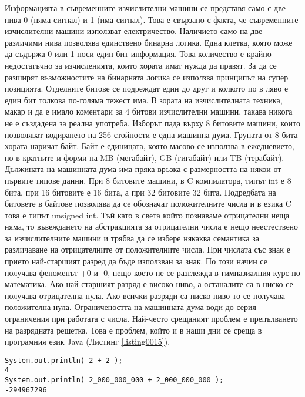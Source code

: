 Информацията в съвременните изчислителни машини се представя само с две нива 0 (няма сигнал) и 1 (има сигнал). Това е свързано с факта, че съвременните изчислителни машини използват електричество. Наличието само на две различими нива позволява единствено бинарна логика. Една клетка, която може да съдържа 0 или 1 носи един бит информация. Това количество е крайно недостатъчно за изчисленията, които хората имат нужда да правят. За да се разширят възможностите на бинарната логика се използва принципът на супер позицията. Отделните битове се подреждат един до друг и колкото по в ляво е един бит толкова по-голяма тежест има. В зората на изчислителната техника, макар и да е имало коментари за 4 битови изчислителни машини, такава никога не е създадена за реална употреба. Изборът пада върху 8 битовите машини, които позволяват кодирането на 256 стойности е една машинна дума. Групата от 8 бита хората наричат байт. Байт е единицата, която масово се използва в ежедневието, но в кратните и форми на MB (мегабайт), GB (гигабайт) или TB (терабайт). Дължината на машинната дума има пряка връзка с размерността на някои от първите типове данни. При 8 битовите машини, в C компилатора, типът int е 8 бита, при 16 битовите е 16 бита, а при 32 битовите 32 бита. Подредбата на битовете в байтове позволява да се обозначат положителните числа и в езика C това е типът unsigned int. Тъй като в света който познаваме отрицателни неща няма, то въвеждането на абстракцията за отрицателни числа е нещо неестествено за изчислителните машини и трябва да се избере някаква семантика за различаване на отрицателните от положителните числа. При числата със знак е прието най-старшият разред да бъде използван за знак. По този начин се получава феноменът +0 и -0, нещо което не се разглежда в гимназиалния курс по математика. Ако най-старшият разряд е високо ниво, а останалите са в ниско се получава отрицателна нула. Ако всички разряди са ниско ниво то се получава положителна нула. Ограничеността на машинната дума води до серия ограничения при работата с числа. Най-често срещаният проблем е препълването на разрядната решетка. Това е проблем, който и в наши дни се среща в програмния език Java (Листинг \ref{listing0015}).

\begin{lstlisting}[caption=Грешка от препълване при събиране, label=listing0015]
System.out.println( 2 + 2 );
4
System.out.println( 2_000_000_000 + 2_000_000_000 );
-294967296
\end{lstlisting}

